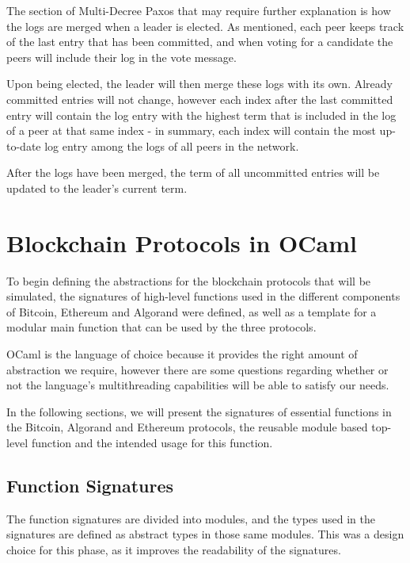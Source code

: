 \vspace{0.2cm}

The section of Multi-Decree Paxos that may require further explanation is how the logs are merged when a leader is elected. As mentioned, each peer keeps track of the last entry that has been committed, and when voting for a candidate the peers will include their log in the vote message.

Upon being elected, the leader will then merge these logs with its own. Already committed entries will not change, however each index after the last committed entry will contain the log entry with the highest term that is included in the log of a peer at that same index - in summary, each index will contain the most up-to-date log entry among the logs of all peers in the network.

After the logs have been merged, the term of all uncommitted entries will be updated to the leader's current term.





\section{Blockchain Protocols in OCaml}

To begin defining the abstractions for the blockchain protocols that will be simulated, the signatures of high-level functions used in the different components of Bitcoin, Ethereum and Algorand were defined, as well as a template for a modular main function that can be used by the three protocols.

OCaml is the language of choice because it provides the right amount of abstraction we require, however there are some questions regarding whether or not the language's multithreading capabilities will be able to satisfy our needs.

In the following sections, we will present the signatures of essential functions in the Bitcoin, Algorand and Ethereum protocols, the reusable module based top-level function and the intended usage for this function.

\subsection{Function Signatures}

The function signatures are divided into modules, and the types used in the signatures are defined as abstract types in those same modules. This was a design choice for this phase, as it improves the readability of the signatures.


